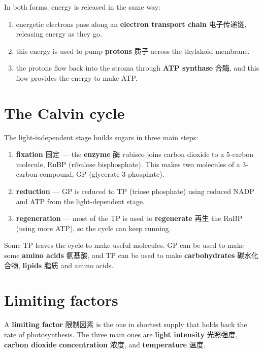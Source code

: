 \documentclass[11pt]{article}
\begin{document}
In both forms, energy is released in the same way:

\begin{enumerate}
\item energetic electrons pass along an \textbf{electron transport chain} 电子传递链, releasing energy as they go.

\item this energy is used to pump \textbf{protons} 质子 across the thylakoid membrane.

\item the protons flow back into the stroma through \textbf{ATP synthase} 合酶, and this flow provides the energy to make ATP.

\end{enumerate}

\section*{The Calvin cycle}

The light-independent stage builds sugars in three main steps:

\begin{enumerate}
\item \textbf{fixation} 固定 — the \textbf{enzyme} 酶 rubisco joins carbon dioxide to a 5-carbon molecule, RuBP (ribulose bisphosphate). This makes two molecules of a 3-carbon compound, GP (glycerate 3-phosphate).

\item \textbf{reduction} — GP is reduced to TP (triose phosphate) using reduced NADP and ATP from the light-dependent stage.

\item \textbf{regeneration} — most of the TP is used to \textbf{regenerate} 再生 the RuBP (using more ATP), so the cycle can keep running.

\end{enumerate}

Some TP leaves the cycle to make useful molecules. GP can be used to make some \textbf{amino acids} 氨基酸, and TP can be used to make \textbf{carbohydrates} 碳水化合物, \textbf{lipids} 脂质 and amino acids.

\section*{Limiting factors}

A \textbf{limiting factor} 限制因素 is the one in shortest supply that holds back the rate of photosynthesis. The three main ones are \textbf{light intensity} 光照强度, \textbf{carbon dioxide} \textbf{concentration} 浓度, and \textbf{temperature} 温度.
\end{document}
